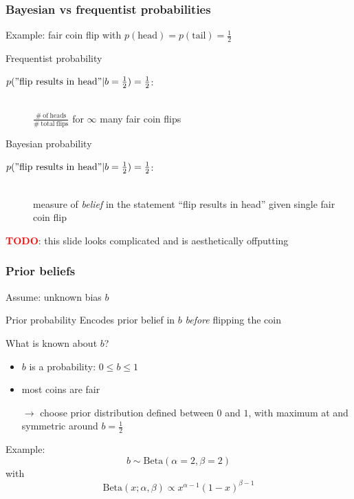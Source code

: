 \documentclass[t,aspectratio=169]{beamer}
\newcommand{\todo}{\textcolor{red}{\textbf{TODO}}}
\begin{document}
\begin{frame}
  \frametitle{Bayesian vs frequentist probabilities}
  Example: fair coin flip with $p(\mathrm{head}) = p(\mathrm{tail}) = \frac{1}{2}$
  \begin{block}{Frequentist probability}
    \begin{description}
    \item[$p(\mathrm{"flip\ results\ in\ head"}|b=\frac{1}{2})=\frac{1}{2}$:] \hfill \\ $\frac{\mathrm{\# \ of \ heads}}{\mathrm{\# \ total \ flips}}$ for $\infty$ many fair coin flips
    \end{description}
  \end{block}
  \begin{block}{Bayesian probability}
    \begin{description}
    \item[$p(\mathrm{"flip\ results\ in\ head"}|b=\frac{1}{2})=\frac{1}{2}$:] \hfill \\ measure of \textit{belief} in the statement ``flip results in head'' given single fair coin flip
    \end{description}
  \end{block}
  \todo: this slide looks complicated and is aesthetically offputting
\end{frame}


\begin{frame}
  \frametitle{Prior beliefs}
  Assume: unknown bias $b$
  \begin{block}{Prior probability}
    Encodes prior belief in $b$ \textit{before} flipping the coin
  \end{block}
  What is known about $b$?
  \begin{itemize}
  \item $b$ is a probability: $0 \leq b \leq 1$
  \item most coins are fair
  \end{itemize}
  \begin{itemize}
  \item[$\rightarrow$] choose prior distribution defined between $0$ and $1$, with maximum at and symmetric around $b=\frac{1}{2}$
  \end{itemize}
  Example:
  \begin{equation*}
    b \sim \mathrm{Beta}(\alpha=2,\beta=2)
  \end{equation*}
  with
  \begin{equation*}
    \mathrm{Beta}(x;\alpha, \beta) \propto x^{\alpha-1}(1-x)^{\beta-1}
  \end{equation*}
\end{frame}
\end{document}
